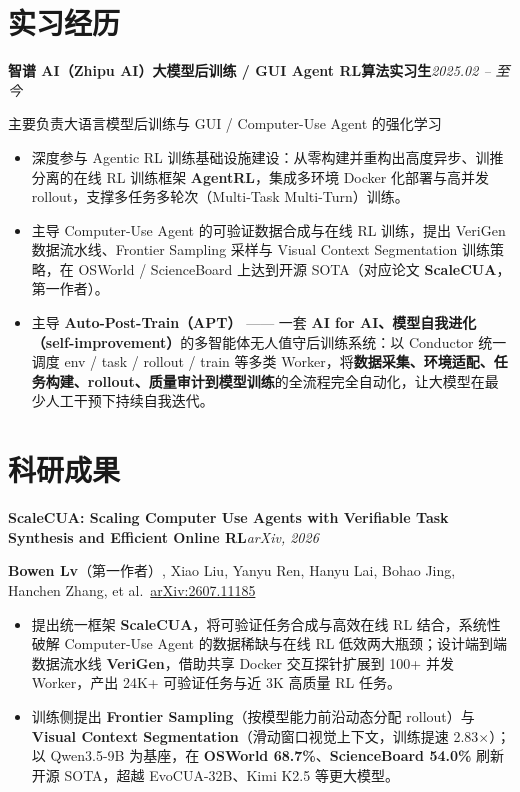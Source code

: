 \documentclass[10pt,a4paper,fontset=none]{ctexart}
\newcommand{\entry}[2]{%
  \par\vspace{1pt}%
  {\sffamily\bfseries\color{inkc}#1}\hfill{\small\itshape\color{mutedc}#2}\par
  \vspace{0.5pt}}
\newcommand{\role}[1]{{\small\color{accentd}\sffamily #1}\par\vspace{1pt}}
\begin{document}
\section{实习经历}
\entry{智谱 AI（Zhipu AI）\quad 大模型后训练 / GUI Agent RL\;算法实习生}{2025.02 -- 至今}
\role{主要负责大语言模型后训练与 GUI / Computer-Use Agent 的强化学习}
\begin{itemize}
  \item 深度参与 Agentic RL 训练基础设施建设：从零构建并重构出高度异步、训推分离的在线 RL 训练框架 \textbf{AgentRL}，集成多环境 Docker 化部署与高并发 rollout，支撑多任务多轮次（Multi-Task Multi-Turn）训练。
  \item 主导 Computer-Use Agent 的可验证数据合成与在线 RL 训练，提出 VeriGen 数据流水线、Frontier Sampling 采样与 Visual Context Segmentation 训练策略，在 OSWorld / ScienceBoard 上达到开源 SOTA（对应论文 \textbf{ScaleCUA}，第一作者）。
  \item 主导 \textbf{Auto-Post-Train（APT）} —— 一套 \textbf{AI for AI、模型自我进化（self-improvement）}的多智能体无人值守后训练系统：以 Conductor 统一调度 env / task / rollout / train 等多类 Worker，将\textbf{数据采集、环境适配、任务构建、rollout、质量审计到模型训练}的全流程完全自动化，让大模型在最少人工干预下持续自我迭代。
\end{itemize}

\section{科研成果}
\entry{ScaleCUA: Scaling Computer Use Agents with Verifiable Task Synthesis and Efficient Online RL}{arXiv, 2026}
\role{\textbf{Bowen Lv}\;（第一作者）, Xiao Liu, Yanyu Ren, Hanyu Lai, Bohao Jing, Hanchen Zhang, et al.\quad\faExternalLink*~\href{https://arxiv.org/abs/2607.11185}{arXiv:2607.11185}}
\begin{itemize}
  \item 提出统一框架 \textbf{ScaleCUA}，将可验证任务合成与高效在线 RL 结合，系统性破解 Computer-Use Agent 的数据稀缺与在线 RL 低效两大瓶颈；设计端到端数据流水线 \textbf{VeriGen}，借助共享 Docker 交互探针扩展到 100+ 并发 Worker，产出 24K+ 可验证任务与近 3K 高质量 RL 任务。
  \item 训练侧提出 \textbf{Frontier Sampling}（按模型能力前沿动态分配 rollout）与 \textbf{Visual Context Segmentation}（滑动窗口视觉上下文，训练提速 2.83$\times$）；以 Qwen3.5-9B 为基座，在 \textbf{OSWorld 68.7\%}、\textbf{ScienceBoard 54.0\%} 刷新开源 SOTA，超越 EvoCUA-32B、Kimi K2.5 等更大模型。
\end{itemize}
\end{document}
